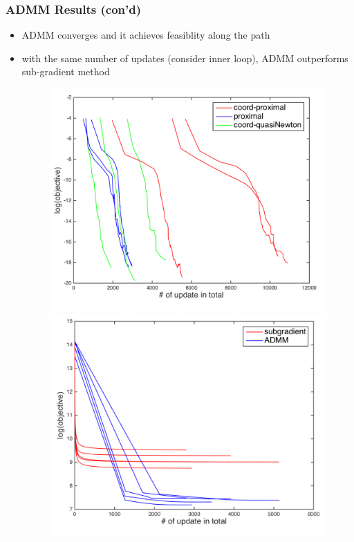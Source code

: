 \documentclass{beamer}
\begin{document}
\begin{frame}
\frametitle{ADMM Results (con'd)}
\begin{itemize}
  \item ADMM converges and it achieves feasiblity along the path
  \item with the same number of updates (consider inner loop), ADMM outperforms sub-gradient method
  \begin{figure}[htbp]
  \centering
  \begin{minipage}{0.45\textwidth}
    \centering
    \includegraphics[width=.8\textwidth]{images/feasibility}
  \end{minipage}
  \hfill
  \begin{minipage}{0.45\textwidth}
    \centering
    \includegraphics[width=.8\textwidth]{images/subgrad}
  \end{minipage}
  \end{figure}
\end{itemize}
\end{frame}
\end{document}
